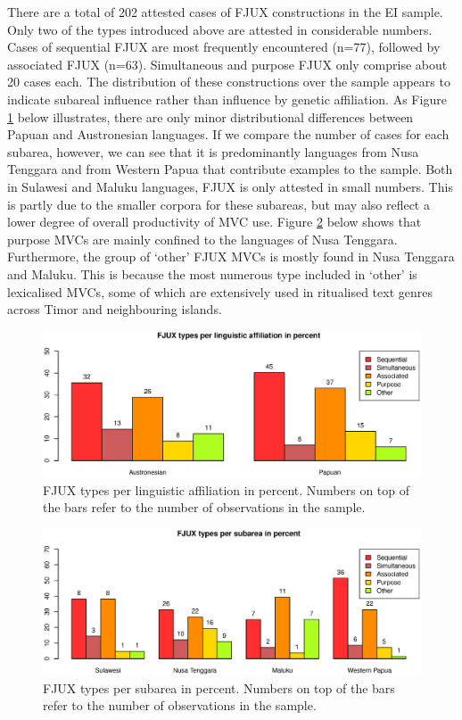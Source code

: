 There are a total of 202 attested cases of FJUX constructions in the EI sample. Only two of the types introduced above are attested in considerable numbers. Cases of sequential FJUX are most frequently encountered (n=77), followed by associated FJUX (n=63). Simultaneous and purpose FJUX only comprise about 20 cases each. The distribution of these constructions over the sample appears to indicate subareal influence rather than influence by genetic affiliation. As Figure \ref{fig:fjux-family} below illustrates, there are only minor distributional differences between Papuan and Austronesian languages. If we compare the number of cases for each subarea, however, we can see that it is predominantly languages from Nusa Tenggara and from Western Papua that contribute examples to the sample. Both in Sulawesi and Maluku languages, FJUX is only attested in small numbers. This is partly due to the smaller corpora for these subareas, but may also reflect a lower degree of overall productivity of MVC use. Figure \ref{fig:fjux-group} below shows that purpose MVCs are mainly confined to the languages of Nusa Tenggara. Furthermore, the group of `other' FJUX MVCs is mostly found in Nusa Tenggara and Maluku. This is because the most numerous type included in `other' is lexicalised MVCs, some of which are extensively used in ritualised text genres across Timor and neighbouring islands.

\begin{figure}
\includegraphics[width=\columnwidth]{figures/FJUX_family.eps}
\caption[FJUX types per linguistic affiliation in percent]{FJUX types per linguistic affiliation in percent. Numbers on top of the bars refer to the number of observations in the sample.}\label{fig:fjux-family}
\end{figure}
\begin{figure}
\includegraphics[width=\columnwidth]{figures/FJUX_group.eps}
\caption[FJUX types per subarea in percent]{FJUX types per subarea in percent. Numbers on top of the bars refer to the number of observations in the sample.}\label{fig:fjux-group}
\end{figure}

